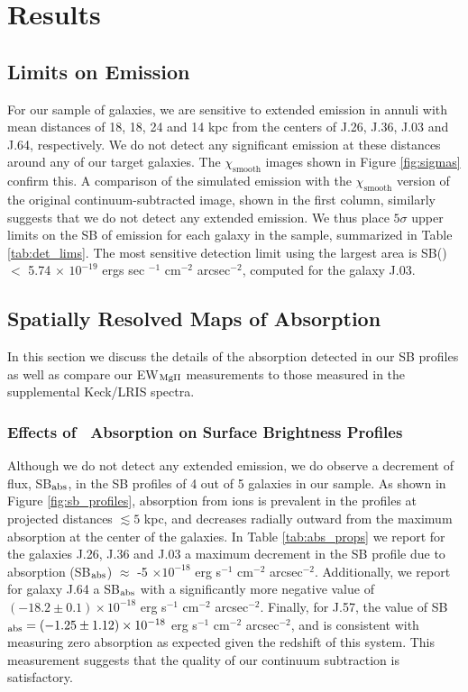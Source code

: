 \documentclass[twocolumn]{aastex62}
\begin{document}
\section{Results}\label{sec:results}

\subsection{Limits on  Emission}
For our sample of galaxies, we are sensitive to extended emission in annuli with mean distances of 18, 18, 24 and 14 kpc from the centers of J.26, J.36, J.03 and J.64, respectively.
 We do not detect any significant  emission at these distances around any of our target galaxies. The $\chi_{\text{smooth}}$ images shown in Figure \ref{fig:sigmas} confirm this. A comparison of the simulated emission with the $\chi_{\text{smooth}}$ version of the original continuum-subtracted image, shown in the first column, similarly suggests that we do not detect any extended  emission. We thus place $5\sigma$ upper limits on the SB of  emission for each galaxy in the sample, summarized in Table \ref{tab:det_lims}. The most sensitive detection limit using the largest area is SB() $<$ 5.74 $\times$ $10^{-19}$ ergs sec $^{-1}$ cm$^{-2}$ arcsec$^{-2}$, computed for the galaxy J.03. 

\subsection{Spatially Resolved Maps of  Absorption}
In this section we discuss the details of the absorption detected in our SB profiles as well as compare our EW$_{\rm{MgII}}$ measurements to those measured in the supplemental Keck/LRIS spectra. 

\subsubsection{Effects of \ Absorption on Surface Brightness Profiles} \label{subsubsec:SBprofiles}
Although we do not detect any extended  emission, we do observe a decrement of flux, SB$_{\rm abs}$, in the SB profiles of 4 out of 5 galaxies in our sample. As shown in Figure \ref{fig:sb_profiles}, absorption from  ions is prevalent in the profiles at projected distances $\lesssim5$ kpc, and decreases radially outward from the maximum absorption at the center of the galaxies. In Table \ref{tab:abs_props} we report for the galaxies J.26, J.36 and J.03 a maximum decrement in the SB profile due to absorption (SB$_{\rm abs}$) $\approx$ -5 $\times10^{-18}$ erg s$^{-1}$ cm$^{-2}$ arcsec$^{-2}$. Additionally, we report for galaxy J.64 a SB$_{\rm abs}$ with a significantly more negative value of $(-18.2 \pm 0.1) \times10^{-18}$ erg s$^{-1}$ cm$^{-2}$ arcsec$^{-2}$. Finally, for J.57, %
the value of SB$_{\rm abs} = (-1.25 \pm 1.12) \times10^{-18}$ erg s$^{-1}$ cm$^{-2}$ arcsec$^{-2}$, and is consistent with measuring zero absorption as expected given the redshift of this system. This measurement suggests that the quality of our continuum subtraction is satisfactory.
\end{document}
